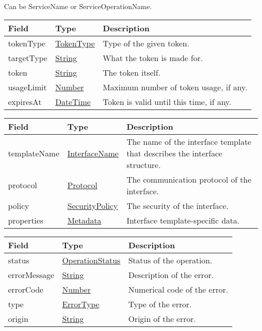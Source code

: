 \documentclass[a4paper]{arrowhead}
\newcommand{\pdef}[1]{{\textcolor{ArrowheadGrey}{#1\label{sec:model:primitives:#1}\label{sec:model:primitives:#1s}\label{sec:model:primitives:#1es}}}}
\newcommand{\pref}[1]{{\textcolor{ArrowheadGrey}{\hyperref[sec:model:primitives:#1]{#1}}}}
\begin{document}

Can be \pdef{ServiceName} or \pdef{ServiceOperationName}.


\begin{table}[ht!]
\begin{tabularx}{\textwidth}{| p{3cm} | p{5.1cm} | X |} \hline
\rowcolor{gray!33} Field & Type & Description \\ \hline
tokenType & \pref{TokenType} & Type of the given token. \\ \hline
targetType & \pref{String} & What the token is made for. \\ \hline
token & \pref{String} & The token itself. \\ \hline
usageLimit & \pref{Number} & Maximum number of token usage, if any. \\ \hline
expiresAt & \pref{DateTime} & Token is valid until this time, if any. \\ \hline
\end{tabularx}
\end{table}

 
\begin{table}[ht!]
\begin{tabularx}{\textwidth}{| p{2.5cm} | p{3cm} | X |} \hline
\rowcolor{gray!33} Field & Type & Description \\ \hline
templateName & \pref{InterfaceName} & The name of the interface template that describes the interface structure. \\ \hline
protocol & \pref{Protocol} & The communication protocol of the interface. \\ \hline
policy & \pref{SecurityPolicy} & The security of the interface. \\ \hline
properties &\hyperref[sec:model:Metadata]{Metadata} & Interface template-specific data. \\ \hline
\end{tabularx}
\end{table}


\begin{table}[ht!]
\begin{tabularx}{\textwidth}{| p{4.25cm} | p{3.5cm} | X |} \hline
\rowcolor{gray!33} Field & Type      & Description \\ \hline
status & \pref{OperationStatus} & Status of the operation. \\ \hline
errorMessage & \pref{String} & Description of the error. \\ \hline
errorCode &\pref{Number}  & Numerical code of the error. \\ \hline
type & \pref{ErrorType} & Type of the error. \\ \hline
origin & \pref{String} & Origin of the error. \\ \hline
\end{tabularx}
\end{table}
\end{document}
